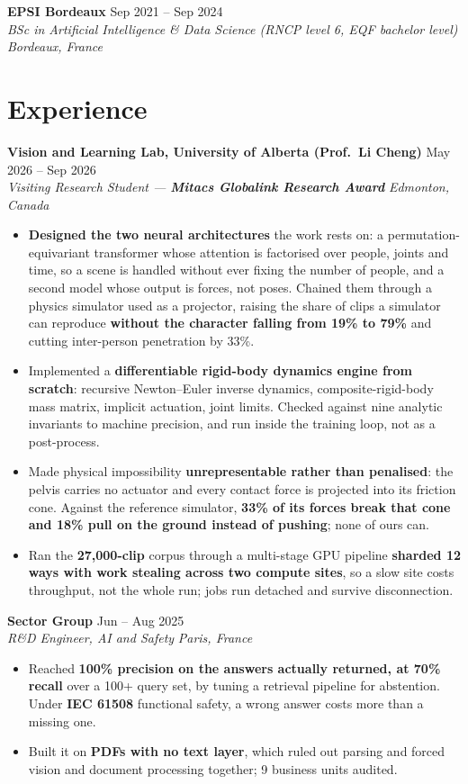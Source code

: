 \documentclass[10pt, letterpaper]{article}
\newcommand{\entry}[4]{%
  \noindent \textbf{#1} \hfill #2 \\
  \textit{#3} \hfill \textit{#4} \par
}
\begin{document}
\entry{EPSI Bordeaux}{Sep 2021 -- Sep 2024}%
{BSc in Artificial Intelligence \& Data Science (RNCP level 6, EQF bachelor level)}{Bordeaux, France}

\section{Experience}

\entry{Vision and Learning Lab, University of Alberta (Prof.\ Li Cheng)}{May 2026 -- Sep 2026}%
{Visiting Research Student --- \textbf{Mitacs Globalink Research Award}}{Edmonton, Canada}
\begin{itemize}
    \item \textbf{Designed the two neural architectures} the work rests on: a permutation-equivariant transformer whose attention is factorised over people, joints and time, so a scene is handled without ever fixing the number of people, and a second model whose output is forces, not poses. Chained them through a physics simulator used as a projector, raising the share of clips a simulator can reproduce \textbf{without the character falling from 19\% to 79\%} and cutting inter-person penetration by 33\%.
    \item Implemented a \textbf{differentiable rigid-body dynamics engine from scratch}: recursive Newton--Euler inverse dynamics, composite-rigid-body mass matrix, implicit actuation, joint limits. Checked against nine analytic invariants to machine precision, and run inside the training loop, not as a post-process.
    \item Made physical impossibility \textbf{unrepresentable rather than penalised}: the pelvis carries no actuator and every contact force is projected into its friction cone. Against the reference simulator, \textbf{33\% of its forces break that cone and 18\% pull on the ground instead of pushing}; none of ours can.
    \item Ran the \textbf{27{,}000-clip} corpus through a multi-stage GPU pipeline \textbf{sharded 12 ways with work stealing across two compute sites}, so a slow site costs throughput, not the whole run; jobs run detached and survive disconnection.
\end{itemize}

\vspace{1pt}

\entry{Sector Group}{Jun -- Aug 2025}{R\&D Engineer, AI and Safety}{Paris, France}
\begin{itemize}
    \item Reached \textbf{100\% precision on the answers actually returned, at 70\% recall} over a 100+ query set, by tuning a retrieval pipeline for abstention. Under \textbf{IEC 61508} functional safety, a wrong answer costs more than a missing one.
    \item Built it on \textbf{PDFs with no text layer}, which ruled out parsing and forced vision and document processing together; 9 business units audited.
\end{itemize}
\end{document}
